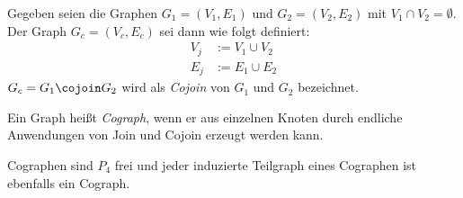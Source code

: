 \begin{mydef}
Gegeben seien die Graphen $G_1=(V_1,E_1)$ und $G_2=(V_2,E_2)$ mit $V_1 \cap V_2=\emptyset$. Der Graph $G_c=(V_c,E_c)$ sei dann wie folgt definiert:
\begin{align*}
V_j&:=V_1\cup V_2 \\
E_j&:=E_1\cup E_2
\end{align*}
$G_c=G_1\cojoin G_2$ wird als \emph{Cojoin} von $G_1$ und $G_2$ bezeichnet.
\end{mydef}

\begin{mydef}[Cograph]
Ein Graph heißt \emph{Cograph}, wenn er aus einzelnen Knoten durch endliche Anwendungen von Join und Cojoin erzeugt werden kann.
\end{mydef}

Cographen sind $P_4$ frei und jeder induzierte Teilgraph eines Cographen ist ebenfalls ein Cograph. \cite{CographsP4free}
